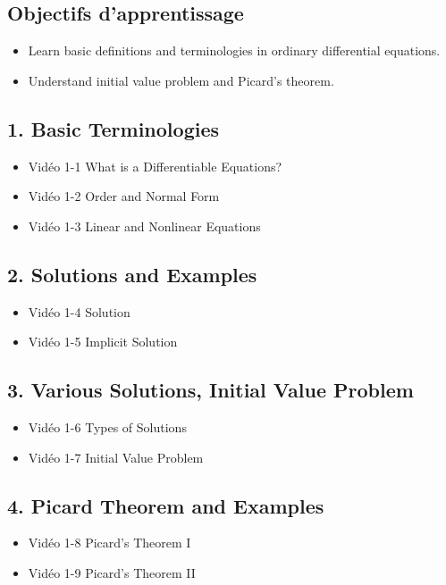 \begin{multicols}{2}

\subsection*{Objectifs d'apprentissage}

\begin{itemize}[label={$\bullet$}]
  \item Learn basic definitions and terminologies in ordinary differential equations.
  \item Understand initial value problem and Picard's theorem.
\end{itemize}

\subsection*{1. Basic Terminologies}

\begin{itemize}[label={$\bullet$}]
  \item Vidéo 1-1 What is a Differentiable Equations? 
  \item Vidéo 1-2 Order and Normal Form
  \item Vidéo 1-3 Linear and Nonlinear Equations
\end{itemize}

\subsection*{2. Solutions and Examples}

\begin{itemize}[label={$\bullet$}]
  \item Vidéo 1-4 Solution
  \item Vidéo 1-5 Implicit Solution
\end{itemize}

\subsection*{3. Various Solutions, Initial Value Problem}

\begin{itemize}[label={$\bullet$}]
  \item Vidéo 1-6 Types of Solutions
  \item Vidéo 1-7 Initial Value Problem
\end{itemize}

\subsection*{4. Picard Theorem and Examples }

\begin{itemize}[label={$\bullet$}]
  \item Vidéo 1-8 Picard's Theorem I
  \item Vidéo 1-9 Picard's Theorem II
\end{itemize}

\end{multicols}

